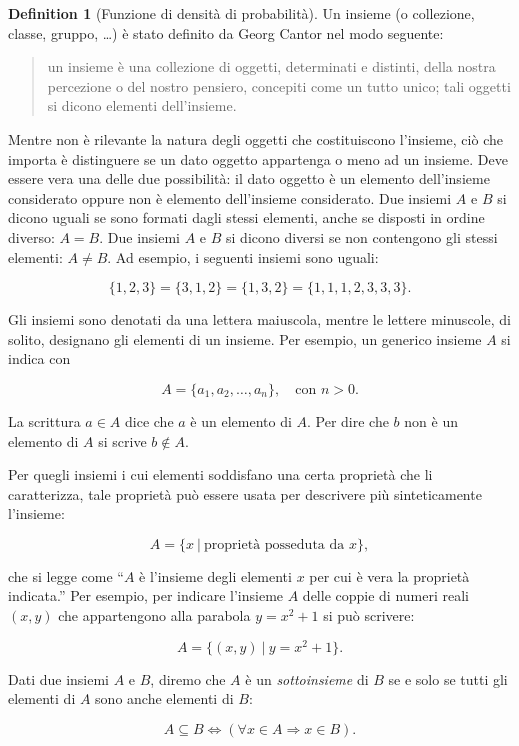\documentclass[
  letterpaper,
  DIV=11,
  numbers=noendperiod,
  oneside]{scrreprt}
\theoremstyle{definition}
\theoremstyle{plain}
\theoremstyle{definition}
\newtheorem{definition}{Definition}[chapter]
\theoremstyle{remark}
\begin{document}
\begin{definition}[Funzione di densità di
probabilità]
Un insieme (o collezione, classe, gruppo, \ldots) è stato definito da
Georg Cantor nel modo seguente:

\begin{quote}
un insieme è una collezione di oggetti, determinati e distinti, della
nostra percezione o del nostro pensiero, concepiti come un tutto unico;
tali oggetti si dicono elementi dell'insieme.
\end{quote}

Mentre non è rilevante la natura degli oggetti che costituiscono
l'insieme, ciò che importa è distinguere se un dato oggetto appartenga o
meno ad un insieme. Deve essere vera una delle due possibilità: il dato
oggetto è un elemento dell'insieme considerato oppure non è elemento
dell'insieme considerato. Due insiemi \(A\) e \(B\) si dicono uguali se
sono formati dagli stessi elementi, anche se disposti in ordine diverso:
\(A=B\). Due insiemi \(A\) e \(B\) si dicono diversi se non contengono
gli stessi elementi: \(A \neq B\). Ad esempio, i seguenti insiemi sono
uguali:

\[
\{1, 2, 3\} = \{3, 1, 2\} = \{1, 3, 2\}= \{1, 1, 1, 2, 3, 3, 3\}.
\]

Gli insiemi sono denotati da una lettera maiuscola, mentre le lettere
minuscole, di solito, designano gli elementi di un insieme. Per esempio,
un generico insieme \(A\) si indica con

\[
A = \{a_1, a_2, \dots, a_n\}, \quad \text{con } n > 0.
\]

La scrittura \(a \in A\) dice che \(a\) è un elemento di \(A\). Per dire
che \(b\) non è un elemento di \(A\) si scrive \(b \notin A.\)

Per quegli insiemi i cui elementi soddisfano una certa proprietà che li
caratterizza, tale proprietà può essere usata per descrivere più
sinteticamente l'insieme:

\[
A = \{x ~\vert~ \text{proprietà posseduta da } x\},
\]

che si legge come ``\(A\) è l'insieme degli elementi \(x\) per cui è
vera la proprietà indicata.'' Per esempio, per indicare l'insieme \(A\)
delle coppie di numeri reali \((x,y)\) che appartengono alla parabola
\(y = x^2 + 1\) si può scrivere:

\[
A = \{(x,y) ~\vert~ y = x^2 + 1\}.
\]

Dati due insiemi \(A\) e \(B\), diremo che \(A\) è un
\emph{sottoinsieme} di \(B\) se e solo se tutti gli elementi di \(A\)
sono anche elementi di \(B\):

\[
A \subseteq B \iff (\forall x \in A \Rightarrow x \in B).
\]


\end{definition}
\end{document}
